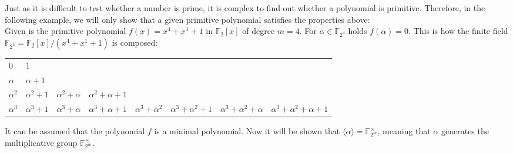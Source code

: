 Just as it is difficult to test whether a number is prime, it is complex to find out whether a polynomial is primitive. \cite[p. 431]{Schneier.2006} Therefore, in the following example, we will only show that a given primitive polynomial satisfies the properties above: \\

Given is the primitive polynomial $f(x)=x^4+x^1+1$ in $\mathbb{F}_2[x]$ of degree $m=4$. For $\alpha \in \mathbb{F}_{2^4}$ holds $f(\alpha)=0$. This is how the finite field $\mathbb{F}_{2^4}=\mathbb{F}_2[x]/(x^4+x^1+1)$ is composed:
\vspace{-0.5 cm}
\begin{center}
	\begin{tabular}{l l l l l l l l}
		   	$0$	& 	$1$ \\
			$\alpha$	&	$\alpha+1$ \\
			$\alpha^2$	&	$\alpha^2+1$	&	$\alpha^2+\alpha$	&	$\alpha^2+\alpha+1$ \\ 
			$\alpha^3$	&	$\alpha^3+1$	&	$\alpha^3+\alpha$	&	$\alpha^3+\alpha+1$	&	$\alpha^3+\alpha^2$ 	&	$\alpha^3+\alpha^2+1$	&
			$\alpha^3+\alpha^2+\alpha$	& $\alpha^3+\alpha^2+\alpha+1$
	\end{tabular}
\end{center}
It can be assumed that the polynomial $f$ is a minimal polynomial. Now it will be shown that $\langle\alpha\rangle=\mathbb{F}_{2^m}^\times$, meaning that $\alpha$ generates the multiplicative group $\mathbb{F}_{2^m}^\times$.
